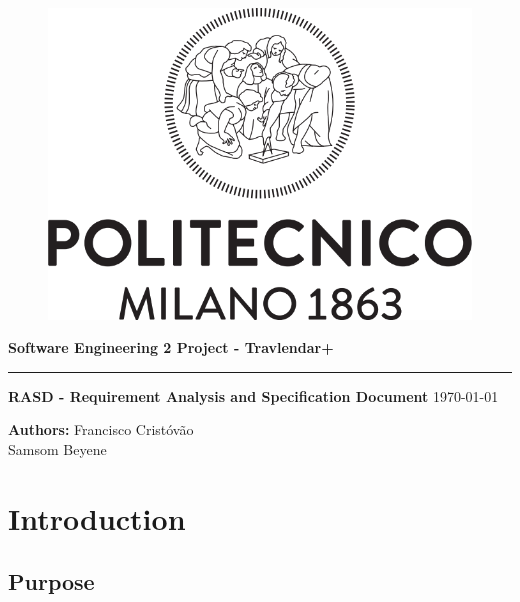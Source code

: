 \documentclass[12pt]{article}
\begin{document}
\begin{titlepage}
    \begin{center}
    \begin{figure}
        \centering
        \includegraphics[scale=0.2]{logoPolimi.png}
        \vspace{1.5cm}
    \end{figure}

    \Huge\textbf{Software Engineering 2 Project - Travlendar+}
    \rule{12cm}{0.5pt}
    \Huge\textbf{RASD - Requirement Analysis and Specification Document}
    \today
    \end{center}
    
    \vspace{3cm}
    
    \begin{flushleft}
        \LARGE\textbf{Authors: }
        \newline\newline
        \Large\texttt{}{Francisco Cristóvão \\ Samsom Beyene}
    \end{flushleft}



\end{titlepage}

\newpage
  \tableofcontents
\newpage

\section{Introduction}

\subsection{Purpose}
\end{document}
